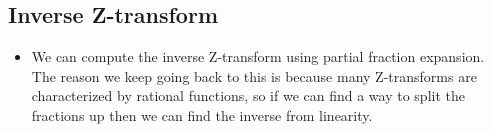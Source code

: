 \subsection{Inverse Z-transform}
\begin{itemize}
	\item We can compute the inverse Z-transform using partial fraction expansion. The reason we keep going back 
		to this is because many Z-transforms are characterized by rational functions, so if we can find a way to 
		split the fractions up then we can find the inverse from linearity.  
\end{itemize}




